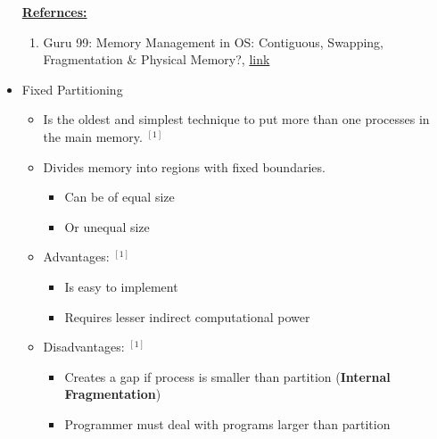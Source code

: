 \documentclass[12pt]{article}
\begin{document}
\begin{itemize}
    \underline{\textbf{Refernces:}}

    \bigskip

    \begin{enumerate}[1)]
        \item Guru 99: Memory Management in OS: Contiguous, Swapping, Fragmentation \& Physical Memory?, \href{https://www.guru99.com/os-memory-management.html#1}{link}
    \end{enumerate}
    \item Fixed Partitioning
    \begin{itemize}
        \item Is the oldest and simplest technique to put more than one processes in
        the main memory. $^{[1]}$
        \item Divides memory into regions with fixed boundaries.
        \begin{itemize}
            \item Can be of equal size
            \item Or unequal size
        \end{itemize}
        \item Advantages: $^{[1]}$
        \begin{itemize}
            \item Is easy to implement
            \item Requires lesser indirect computational power
        \end{itemize}
        \item Disadvantages: $^{[1]}$
        \begin{itemize}
            \item Creates a gap if process is smaller than partition (\textbf{Internal Fragmentation})
            \item Programmer must deal with programs larger than partition
        \end{itemize}
    \end{itemize}


\end{itemize}
\end{document}
